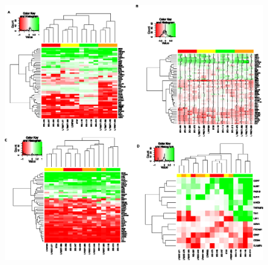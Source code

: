 \documentclass[12pt,oupdraft]{biostatistics}
\begin{document}
\begin{figure}
\centering
\includegraphics{TIKZFig2.eps}

\end{figure}
\end{document}
